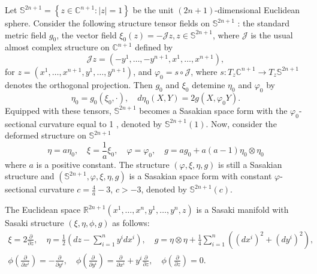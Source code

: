 \begin{example}[$\mathbb{S}^{2 n+1}, c>-3$]
    Let $\mathbb{S}^{2 n+1}=\left\{z \in \mathbb{C}^{n+1}:|z|=1\right\}$ be the unit $(2 n+1)$-dimensional Euclidean sphere. Consider the following structure tensor fields on $\mathbb{S}^{2 n+1}$ : the standard metric field $g_0$, the vector field $\xi_0(z)=-\mathcal{J} z, z \in \mathbb{S}^{2 n+1}$, where $\mathcal{J}$ is the usual almost complex structure on $\mathbb{C}^{n+1}$ defined by
$$
\mathcal{J} z=\left(-y^1, \ldots,-y^{n+1}, x^1, \ldots, x^{n+1}\right),
$$
for $z=\left(x^1, \ldots, x^{n+1}, y^1, \ldots, y^{n+1}\right)$, and $\varphi_0=s \circ \mathcal{J}$, where $s: T_z \mathbb{C}^{n+1} \rightarrow T_z \mathbb{S}^{2 n+1}$ denotes the orthogonal projection.  Then $g_0$ and $\xi_0$ detemine $\eta_0$ and $\varphi_0$ by 
$$
\eta_0=g_0(\xi_0,\cdot), \quad d\eta_0(X,Y)=2g( X,\varphi_0 Y).
$$
Equipped with these tensors, $\mathbb{S}^{2 n+1}$ becomes a Sasakian space form with the $\varphi_0$-sectional curvature equal to 1 , denoted by $\mathbb{S}^{2 n+1}(1)$. Now, consider the deformed structure on $\mathbb{S}^{2 n+1}$
$$
\eta=a \eta_0, \quad \xi=\frac{1}{a} \xi_0, \quad \varphi=\varphi_0, \quad g=a g_0+a(a-1) \eta_0 \otimes \eta_0
$$
where $a$ is a positive constant. The structure $(\varphi, \xi, \eta, g)$ is still a Sasakian structure and $\left(\mathbb{S}^{2 n+1}, \varphi, \xi, \eta, g\right)$ is a Sasakian space form with constant $\varphi$-sectional curvature $c=\frac{4}{a}-3$, $c>-3$, denoted by $\mathbb{S}^{2 n+1}(c)$.
\end{example}

\begin{example}[$\mathbb{R}^{2 n+1}, c=-3$]
    The Euclidean space $\mathbb{R}^{2 n+1}\left(x^1, \ldots, x^n, y^1, \ldots, y^n, z\right)$ is a Sasaki manifold with Sasaki structure $(\xi, \eta, \phi, g)$ as follows:
$$
\begin{gathered}
\xi=2 \frac{\partial}{\partial z}, \quad \eta=\frac{1}{2}\left(d z-\sum_{i=1}^n y^i d x^i\right), \quad g=\eta \otimes \eta+\frac{1}{4} \sum_{i=1}^n\left(\left(d x^i\right)^2+\left(d y^i\right)^2\right), \\
\phi\left(\frac{\partial}{\partial x^i}\right)=-\frac{\partial}{\partial y^i}, \quad \phi\left(\frac{\partial}{\partial y^i}\right)=\frac{\partial}{\partial x^i}+y^i \frac{\partial}{\partial z}, \quad \phi\left(\frac{\partial}{\partial z}\right)=0 .
\end{gathered}
$$
\end{example}

